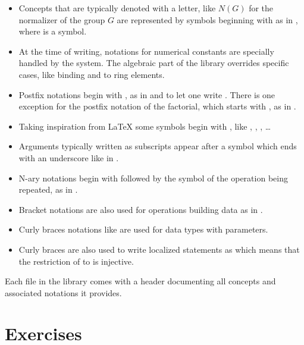 \begin{itemize}
\item Concepts that are typically denoted with a letter, like $N(G)$ for the
	normalizer of the group $G$ are represented by symbols beginning
	with  as in , where  is a symbol.
\item At the time of writing, notations for numerical constants are specially
	handled by the system.  The algebraic part of the library overrides
	specific cases, like binding  and  to ring elements.
\item Postfix notations begin with , as in  and 
	to let one write . There is one exception for
        the postfix notation of the factorial, which starts with
        , as in .
\item Taking inspiration from \LaTeX{} some symbols begin with \C{\\},
	like \C{\\in}, \C{\\matrix}, \C{\\sum}, \ldots
\item Arguments typically written as subscripts appear after a symbol
	which ends with an underscore like  in .
\item N-ary notations begin with \C{[} followed by the symbol of the
	operation being repeated, as in .
\item Bracket notations are also used  for operations building data as in
	\C{[seq .. | .. ]}.
\item Curly braces notations like  are used for data types
	with parameters.
\item Curly braces are also used to write localized statements
	as 
	which means that the restriction of  to  is injective.
\end{itemize}

Each file in the \mcbMC{} library comes with a header documenting
all concepts and associated notations it provides.


\newpage
\section{Exercises}

